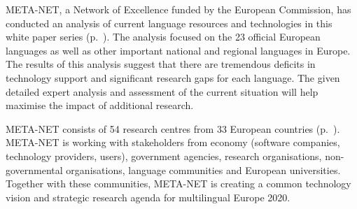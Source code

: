 \begin{Parallel}[c]{78mm}{78mm}
{META-NET, a Network of Excellence funded by the European Commission, has conducted an  analysis of current language resources and technologies in this white paper series (p.~\pageref{whitepaperseries}). The analysis focused on the 23 official European languages as well as other important national and regional languages in Europe. The results of this analysis suggest that there are tremendous deficits in technology support and significant research gaps for each language. The given detailed expert analysis and assessment of the current situation will help maximise the impact of additional research.

META-NET consists of 54 research centres from 33 European countries \cite{rehm2011} (p.~\pageref{metanetmembers}). META-NET is working with stakeholders from economy (software companies, technology providers, users), government agencies, research organisations, non-governmental organisations, language communities and European universities. Together with these communities, META-NET is creating a common technology vision and strategic research agenda for multilingual Europe 2020.}%
\end{Parallel}


\makefundingnotice

\cleardoublepage


\renewcommand\contentsname{}
\tableofcontents



\cleardoublepage

\setcounter{page}{1}
\pagestyle{scrheadings}



